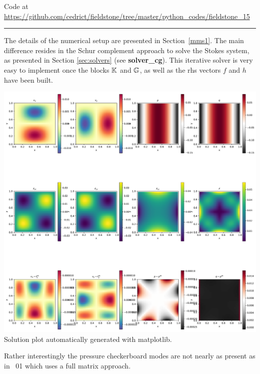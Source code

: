 

\begin{center}
Code at \url{https://github.com/cedrict/fieldstone/tree/master/python_codes/fieldstone_15}
\end{center}

\par\noindent\rule{\textwidth}{0.4pt}

The details of the numerical setup are presented in Section~\ref{mms1}.
The main difference resides in the Schur complement approach to solve the 
Stokes system, as presented in Section \ref{sec:solvers} (see {\bf solver\_cg}).
This iterative solver is very easy to implement once the blocks ${\mathbb{K}}$ and ${\mathbb{G}}$, 
as well as the rhs vectors $f$ and $h$ have been built. 

\begin{center}
\includegraphics[width=15cm]{python_codes/fieldstone_15/results/solution.pdf}\\
{\captionfont Solution plot automatically generated with matplotlib.}
\end{center}

Rather interestingly the pressure checkerboard modes are not nearly as present as 
in \stone~01 which uses a full matrix approach. 

